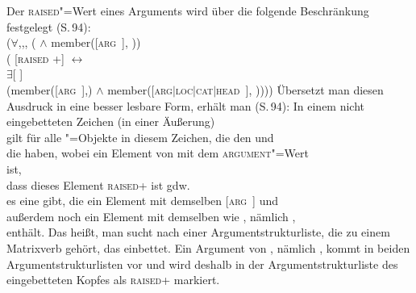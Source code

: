 Der \textsc{raised}"=Wert eines Arguments wird über die folgende Beschränkung
festgelegt (S.\,94):
\ea
\label{raised-wert}
 \impl\\
\mbox{}\hspace{3ex}($\forall$,,, (  $\wedge$ member([\textsc{arg} \,], )) \impl\\
\mbox{}\hspace{6ex}( [\textsc{raised} +] $\leftrightarrow$\\
\mbox{}\hspace{9ex}$\exists$[\argst {} ]\\
\mbox{}\hspace{9ex}(member([\textsc{arg} \,],) $\wedge$ member([\textsc{arg$|$loc$|$cat$|$head} \,], ))))
\z
Übersetzt man diesen Ausdruck in eine besser lesbare Form, erhält man (S.\,94):
\eanoraggedright
In einem nicht eingebetteten Zeichen (\dash in einer Äußerung)\\
\mbox{}\hspace{3ex}gilt für alle "=Objekte in diesem Zeichen, die den \headw{}  und\\
\mbox{}\hspace{3ex}die \argst{}  haben, wobei  ein Element von  mit dem
     \textsc{argument}"=Wert \\
\mbox{}\hspace{3ex}ist,\\
\mbox{}\hspace{3ex}dass dieses Element  \textsc{raised}+ ist gdw.\ \\
\mbox{}\hspace{6ex}es eine \argstl gibt, die ein Element mit demselben [\textsc{arg} \,] und\\
\mbox{}\hspace{6ex}außerdem noch ein Element mit demselben \headw wie , nämlich ,\\
\mbox{}\hspace{6ex}enthält.
\z
Das heißt, man sucht nach einer Argumentstrukturliste, die zu einem Matrixverb gehört, das
 einbettet. Ein Argument von , nämlich , kommt in beiden Argumentstrukturlisten
vor und wird deshalb in der Argumentstrukturliste des eingebetteten Kopfes als \textsc{raised}+
markiert.

